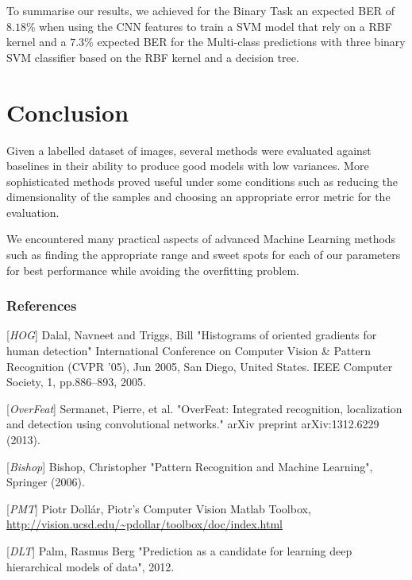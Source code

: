 \documentclass{article} %
\begin{document}
To summarise our results, we achieved for the Binary Task an expected BER of $8.18$\% when using the CNN features to train a SVM model that rely on a RBF kernel and a $7.3$\% expected BER for the Multi-class predictions with three binary SVM classifier based on the RBF kernel and a decision tree.

\section{Conclusion}

Given a labelled dataset of images, several methods were evaluated against baselines in their ability to produce good models with low variances. More sophisticated methods proved useful under some conditions such as reducing the dimensionality of the samples and choosing an appropriate error metric for the evaluation.

We encountered many practical aspects of advanced Machine Learning methods such as finding the appropriate range and sweet spots for each of our parameters for best performance while avoiding the overfitting problem.


\subsubsection*{References}
[\textit{HOG}] Dalal, Navneet and Triggs, Bill "Histograms of oriented gradients for human detection" International Conference on Computer Vision \& Pattern Recognition (CVPR ’05), Jun 2005, San Diego, United States. IEEE Computer Society, 1, pp.886–893, 2005.

[\textit{OverFeat}] Sermanet, Pierre, et al. "OverFeat: Integrated recognition, localization and detection using convolutional networks." arXiv preprint arXiv:1312.6229 (2013).

[\textit{Bishop}] Bishop, Christopher "Pattern Recognition and Machine Learning", Springer (2006).

[\textit{PMT}] Piotr Doll\'ar, Piotr's Computer Vision Matlab Toolbox, \url{http://vision.ucsd.edu/~pdollar/toolbox/doc/index.html}

[\textit{DLT}] Palm, Rasmus Berg "Prediction as a candidate for learning deep hierarchical models of data", 2012.
\end{document}

